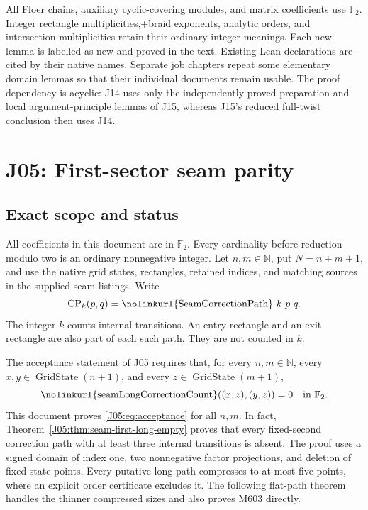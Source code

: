 \documentclass[11pt,oneside]{report}
\theoremstyle{definition}
\numberwithin{equation}{section}
\newcommand{\F}{\mathbb F_2}
\newcommand{\decl}[1]{\textnormal{\nolinkurl{#1}}}
\newcommand{\CP}{\operatorname{CP}}
\begin{document}
All Floer chains, auxiliary cyclic-covering modules, and matrix
coefficients use $\mathbb F_2$. Integer rectangle multiplicities,+braid exponents, analytic orders, and intersection multiplicities
retain their ordinary integer meanings. Each new lemma is labelled
as new and proved in the text. Existing Lean declarations are cited
by their native names. Separate job chapters repeat some elementary
domain lemmas so that their individual documents remain usable.
The proof dependency is acyclic: J14 uses only the independently
proved preparation and local argument-principle lemmas of J15,
whereas J15's reduced full-twist conclusion then uses J14.
\tableofcontents


\chapter{J05: First-sector seam parity}
\label{chapter:J05}



\section{Exact scope and status}

All coefficients in this document are in $\F$. Every cardinality before reduction
modulo two is an ordinary nonnegative integer. Let $n,m\in\mathbb N$, put
$N=n+m+1$, and use the native grid states, rectangles, retained indices, and
matching sources in the supplied seam listings. Write
\[
 \CP_k(p,q)=\decl{SeamCorrectionPath}\ k\ p\ q.
\]
The integer $k$ counts internal transitions. An entry rectangle and an exit
rectangle are also part of each such path. They are not counted in $k$.

The acceptance statement of J05 requires that, for every $n,m\in\mathbb N$,
every $x,y\in\operatorname{GridState}(n+1)$, and every
$z\in\operatorname{GridState}(m+1)$,
\begin{equation}\label{J05:eq:acceptance}
 \decl{seamLongCorrectionCount}((x,z),(y,z))=0\quad\text{in }\F.
\end{equation}
This document proves \eqref{J05:eq:acceptance} for all $n,m$.
In fact, Theorem~\ref{J05:thm:seam-first-long-empty} proves that every
fixed-second correction path with at least three internal transitions is
absent. The proof uses a signed domain of index one, two nonnegative factor
projections, and deletion of fixed state points. Every putative long path
compresses to at most five points, where an explicit order certificate
excludes it. The following flat-path theorem handles the thinner compressed
sizes and also proves M603 directly.
\end{document}
